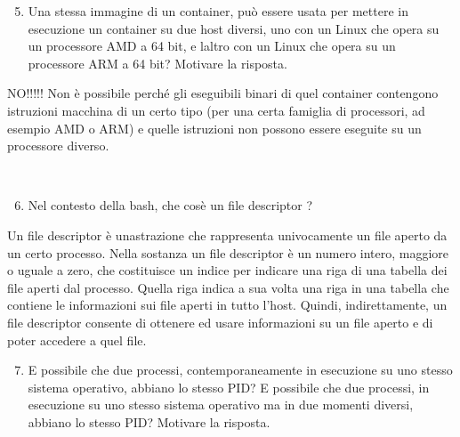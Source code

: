 \documentclass[
]{article}
\providecommand{\tightlist}{%
  \setlength{\itemsep}{0pt}\setlength{\parskip}{0pt}}
\begin{document}
{}

{}

\begin{enumerate}
\setcounter{enumi}{4}
\tightlist
\item
  {Una stessa immagine di un container, può essere usata per mettere in
  esecuzione un container su due host diversi, uno con un Linux che
  opera su un processore AMD a 64 bit, e l\textquotesingle altro con un
  Linux che opera su un processore ARM a 64 bit? Motivare la risposta.}
\end{enumerate}

{}

{NO!!!!! Non è possibile perché gli eseguibili binari di quel container
contengono istruzioni macchina di un certo tipo (per una certa famiglia
di processori, ad esempio AMD o ARM) e quelle istruzioni non possono
essere eseguite su un processore diverso.}

{}

{~}

{}

\begin{enumerate}
\setcounter{enumi}{5}
\tightlist
\item
  {Nel contesto della bash, che cos\textquotesingle è un file descriptor
  ?}
\end{enumerate}

{}

{Un file descriptor è un\textquotesingle astrazione che rappresenta
univocamente un file aperto da un certo processo. Nella sostanza un file
descriptor è un numero intero, maggiore o uguale a zero, che costituisce
un indice per indicare una riga di una tabella dei file aperti dal
processo. Quella riga indica a sua volta una riga in una tabella che
contiene le informazioni sui file aperti in tutto l'host. Quindi,
indirettamente, un file descriptor consente di ottenere ed usare
informazioni su un file aperto e di poter accedere a quel file. }

{}

{}

\begin{enumerate}
\setcounter{enumi}{6}
\tightlist
\item
  {E\textquotesingle{} possibile che due processi, contemporaneamente in
  esecuzione su uno stesso sistema operativo, abbiano lo stesso PID?
  E\textquotesingle{} possibile che due processi, in esecuzione su uno
  stesso sistema operativo ma in due momenti diversi, abbiano lo stesso
  PID? Motivare la risposta.}
\end{enumerate}
\end{document}
